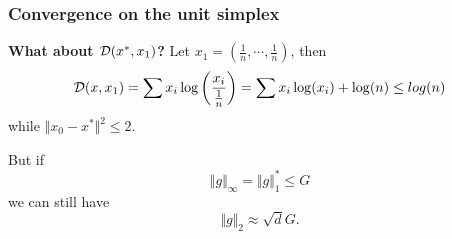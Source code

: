 \documentclass{beamer}
\begin{document}
\begin{frame}
  \frametitle{Convergence on the unit simplex}
    \textbf{What about $\mathcal{D}(x^*, x_1) $?}
    Let $x_1 = (\frac{1}{n}, \cdots , \frac{1}{n})$, then
    \begin{equation}
      \mathcal{D}(x, x_1) = \sum x_i \log\left(\frac{x_i}{\frac1n}\right) = \sum x_i \log(x_i) + \log(n) \le log(n)
    \end{equation}
    while $ \Vert x_0 - x^* \Vert^2 \le 2$.

    But if
    \begin{equation}
      \Vert g \Vert_\infty = \Vert g \Vert_1^* \le G
    \end{equation}
    we can still have
    \begin{equation}
      \Vert g \Vert_2 \approx \sqrt{d} G.
    \end{equation}
\end{frame}

\end{document}
